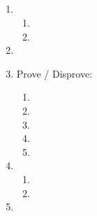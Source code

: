 \documentclass{article}
\title{
    \textmd{\bd{\hmwkClass:\ \hmwkTitle}}\\
}
\author{\hmwkAuthorName}
\begin{document}
\maketitle

\begin{enumerate}
      \item
            \begin{enumerate}
                  \item 
                        \pagebreak

                  \item 
            \end{enumerate}

            \pagebreak

      \item 

            \pagebreak

      \item Prove / Disprove:
            \begin{enumerate}
                  \item 
                  \item 
                  \item \TODO 
                  \item \TODO 
                  \item \TODO 
            \end{enumerate}

            \pagebreak

      \item
            \begin{enumerate}
                  \item \REV 
                  \item \REV 
            \end{enumerate}

      \item \TODO 


\end{enumerate}

 \TODO
\end{document}
